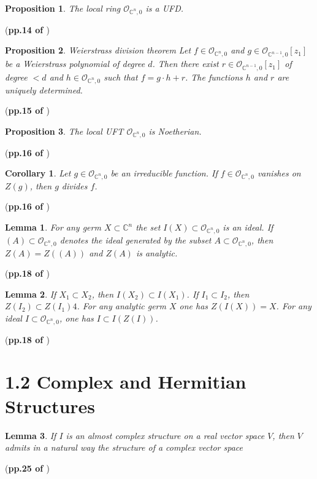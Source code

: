 \documentclass{book}
\numberwithin{equation}{subsection} %
\newtheorem{lemma}{Lemma}[section]
\newtheorem{prop}{Proposition}[section]
\newtheorem{coro}{Corollary}[section]
\theoremstyle{definition}
\begin{document}
\begin{prop}
    The local ring $\mathcal{O}_{\mathbb{C}^n,0}$ is a UFD.
\end{prop}
(\textbf{pp.14 of \cite{book}})

\begin{prop}{Weierstrass division theorem}
    Let $f\in \mathcal{O}_{\mathbb{C}^n,0}$ and $g\in
    \mathcal{O}_{\mathbb{C}^{n-1},0}[z_1]$ be a Weierstrass
    polynomial of degree $d$. Then there exist $r\in
    \mathcal{O}_{\mathbb{C}^{n-1},0}[z_1]$ of degree $<d$
    and $h\in \mathcal{O}_{\mathbb{C}^n,0}$ such that $f=g\cdot h+r$.
    The functions $h$ and $r$ are uniquely determined.
\end{prop}
(\textbf{pp.15 of \cite{book}})

\begin{prop}
    The local UFT $\mathcal{O}_{\mathbb{C}^n,0}$ is Noetherian.
\end{prop}
(\textbf{pp.16 of \cite{book}})

\begin{coro}
    Let $g\in \mathcal{O}_{\mathbb{C}^n,0}$ be an irreducible function.
    If $f\in\mathcal{O}_{\mathbb{C}^n,0}$ vanishes on $Z(g)$, then
    $g$ divides $f$.
\end{coro}
(\textbf{pp.16 of \cite{book}})

\begin{lemma}
    For any germ $X\subset \mathbb{C}^n$ the set $I(X)\subset
    \mathcal{O}_{\mathbb{C}^n,0}$ is an ideal.
    If $(A)\subset \mathcal{O}_{\mathbb{C}^n,0}$ denotes the ideal
    generated by the subset $A\subset \mathcal{O}_{\mathbb{C}^n,0}$,
    then $Z(A)=Z((A))$ and $Z(A)$ is analytic.
\end{lemma}
(\textbf{pp.18 of \cite{book}})

\begin{lemma}
    If $X_1\subset X_2$, then $I(X_2)\subset I(X_1)$. If $I_1\subset I_2$,
    then $Z(I_2)\subset Z(I_1)4$. For any analytic germ $X$ one has
    $Z(I(X))=X$. For any ideal $I\subset \mathcal{O}_{\mathbb{C}^n,0}$,
    one has $I\subset I(Z(I))$.
\end{lemma}
(\textbf{pp.18 of \cite{book}})

\section{1.2 Complex and Hermitian Structures}
\begin{lemma}
    If $I$ is an almost complex structure on a real vector space $V$,
    then $V$ admits in a natural way the structure of a complex vector
    space
\end{lemma}
(\textbf{pp.25 of \cite{book}})
\end{document}
